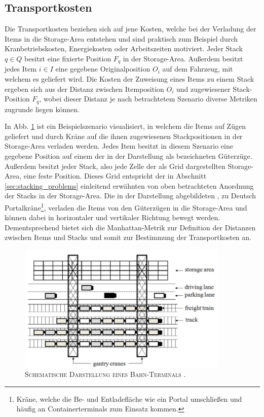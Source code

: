 \vfill
\pagebreak

\subsection{Transportkosten}
\label{sec:transport_costs}
Die Transportkosten beziehen sich auf jene Kosten, welche bei der Verladung der Items in die Storage-Area entstehen
und sind praktisch zum Beispiel durch Kranbetriebskosten, Energiekosten oder Arbeitszeiten motiviert.\newline
Jeder Stack $q \in Q$ besitzt eine fixierte Position $F_q$ in der Storage-Area.
Außerdem besitzt jedes Item $i \in I$ eine gegebene Originalposition $O_i$ auf dem Fahrzeug, mit welchem es geliefert wird.
Die Kosten der Zuweisung eines Items zu einem Stack ergeben sich aus der Distanz zwischen Itemposition $O_i$ und
zugewiesener Stack-Position $F_q$, wobei dieser Distanz je nach betrachtetem Szenario diverse Metriken zugrunde liegen können.

In Abb. \ref{fig:costs} ist ein Beispielszenario visualisiert, in welchem die Items auf Zügen geliefert und durch Kräne auf die ihnen zugewiesenen Stackpositionen in der Storage-Area verladen werden.
Jedes Item besitzt in diesem Szenario eine gegebene Position auf einem der in der Darstellung als  bezeichneten Güterzüge. Außerdem besitzt jeder Stack, also jede Zelle der als Grid dargestellten Storage-Area,
eine feste Position. Dieses Grid entspricht der in Abschnitt \ref{sec:stacking_problems} einleitend erwähnten
von oben betrachteten Anordnung der Stacks in der Storage-Area.
Die in der Darstellung abgebildeten , zu Deutsch
Portalkräne\footnote{Kräne, welche die Be- und Entladefläche wie ein Portal umschließen und häufig an
Containerterminals zum Einsatz kommen.}, verladen die Items von den Güterzügen in die
Storage-Area und können dabei in horizontaler und vertikaler Richtung bewegt werden. Dementsprechend bietet sich die Manhattan-Metrik zur Definition der Distanzen zwischen Items und Stacks und somit zur Bestimmung der Transportkosten an.

\begin{figure}[H]
\includegraphics[width=0.9\textwidth]{img/costs.png}
\caption{\textsc{Schematische Darstellung eines Bahn-Terminals} \cite{Briskorn2018}.}
\label{fig:costs}
\end{figure}

